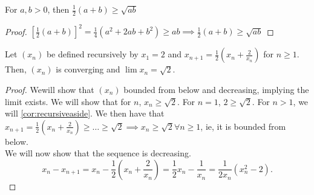 \documentclass[12pt]{article}
\begin{document}

\begin{corollary}\label{cor:recursiveaside}
  For $a,b > 0$, then $\frac{1}{2}(a+b) \geq \sqrt{ab}$
\end{corollary}
\begin{proof}
  $\left[\frac{1}{2}(a+b)\right]^2 = \frac{1}{4}(a^2 + 2ab + b^2) \geq ab \implies \frac{1}{2}(a+b)\geq \sqrt{ab}$
\end{proof}

\begin{example}
  Let $(x_n)$ be defined recursively by $x_1 = 2$ and $x_{n+1} = \frac{1}{2}\left(x_n + \frac{2}{x_n}\right)$ for $n \geq 1$. Then, $(x_n)$ is converging and $\lim x_n = \sqrt{2}$.
  \begin{proof}
    We\footnotemark  will show that $(x_n)$ bounded from below and decreasing, implying the limit exists. We will show that for $n$, $x_n \geq \sqrt{2}$. For $n = 1$, $2 \geq \sqrt{2}$. For $n > 1$, we will \cref{cor:recursiveaside}. We then have that $x_{n+1} = \frac{1}{2}(x_n + \frac{2}{x_n}) \geq \dots \geq \sqrt{2} \implies x_n \geq \sqrt{2} \forall n \geq 1$, ie, it is bounded from below.\\
    We will now show that the sequence is decreasing.
    \[x_n - x_{n+1} = x_n - \frac{1}{2}(x_n + \frac{2}{x_n}) = \frac{1}{2}x_n - \frac{1}{x_n} = \frac{1}{2x_n}(x_n^2 - 2).\]
  \end{proof}
\end{example}
\end{document}
